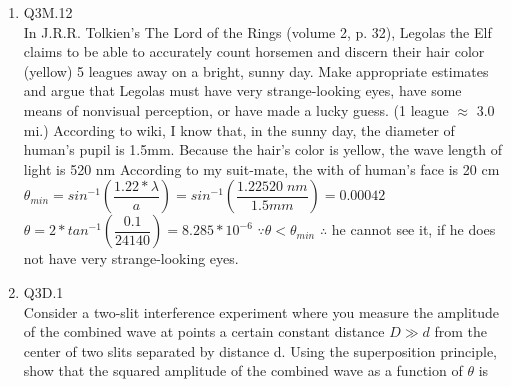 \documentclass{article}
\theoremstyle{definition}
\theoremstyle{plain}
\begin{document}
\begin {enumerate}[itemindent=30pt,label=\bf Exercise {\arabic*}:]
You are setting up a pair of PA speakers on a field in preparation for an outdoor event. Each speaker is 0.65 m wide, and the speakers are separated by 8.2 m. To test the speakers, your coworker plays a single tone through the speakers whose frequency is 440 Hz. You are standing 52 m directly in front of the speakers and facing them. Roughly how far would you have to walk to your left or right to hear the sound amplitude drop almost to zero? How much farther would you have to go to hear the amplitude go back to its original strength? 
\begin{align*}
	\lambda &= \dfrac{v}{f} = \dfrac{340 m/s}{440 s^{-1}} = 0.77 m\\
	\theta_{0} &= sin^{-1}(\frac{\lambda}{d}) = sin^{-1}{\frac{0.77 m}{8.3 m}} = 0.09\quad rad\\
	\theta_{1} &= sin^{-1}(\frac{\lambda}{2d})= sin^{-1}{\frac{0.77 m}{2 * 8.3 m}} = 0.046\quad rad\\	   
	y_{0} &= D*tan(\theta_{0}) = 52* tan(0.046)  = 2.42 m \\ 
	y_{1} &= D*tan(\theta) = 52* tan(0.09) = 4.69 m
\end{align*}
\subitem I should walk 2.42 to hear the sound drop almost to zero, and I should walk 4.69m to hear the amplitude go back to original strength.
\\
\item Q3M.12\\ In J.R.R. Tolkien's The Lord of the Rings (volume 2, p. 32), Legolas the Elf claims to be able to accurately count horsemen and discern their hair color (yellow) 5 leagues away on a bright, sunny day. Make appropriate estimates and argue that Legolas must have very strange-looking eyes, have some means of nonvisual perception, or have made a lucky guess. (1 league $\approx$ 3.0 mi.)
\subitem According to wiki, I know that, in the sunny day, the diameter of human's pupil is 1.5mm.
\subitem Because the hair's color is yellow, the wave length of light is 520 nm
\subitem According to my suit-mate, the with of human's face is 20 cm
\subitem $\theta_{min} = sin^{-1}(\dfrac{1.22* \lambda}{a}) = sin^{-1}(\dfrac{1.22 520\;nm}{1.5 mm}) = 0.00042$
\subitem $\theta = 2*tan^{-1}(\dfrac{0.1}{24140}) = 8.285*10^{-6}$
\subitem $\because \theta < \theta_{min}$
\subitem $\therefore$ he cannot see it, if he does not have very strange-looking eyes.
\newpage
\item Q3D.1\\
Consider a two-slit interference experiment where you measure the amplitude of the combined wave at points a certain constant distance $D \gg d$ from the center of two slits separated by distance d. Using the superposition principle, show that the squared amplitude of the combined wave as a function of $\theta$ is 

\end{enumerate}
\end{document}
